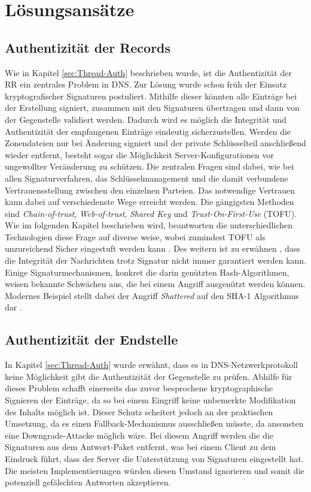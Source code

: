 \chapter{Lösungsansätze}

\section{Authentizität der Records}
\label{sec:Solution-RecordAuth}

Wie in Kapitel \ref{sec:Thread-Auth} beschrieben wurde, ist die Authentizität der RR ein zentrales Problem in DNS. Zur Lösung wurde schon früh der Einsatz kryptografischer Signaturen postuliert. Mithilfe dieser könnten alle Einträge bei der Erstellung signiert, zusammen mit den Signaturen übertragen und dann von der Gegenstelle validiert werden. Dadurch wird es möglich die Integrität und Authentizität der empfangenen Einträge eindeutig sicherzustellen. Werden die Zonendateien nur bei Änderung signiert und der private Schlüsselteil anschließend wieder entfernt, besteht sogar die Möglichkeit Server-Konfigurationen vor ungewollter Veränderung zu schützen. 
Die zentralen Fragen sind dabei, wie bei allen Signaturverfahren, das Schlüsselmanagement und die damit verbundene Vertrauensstellung zwischen den einzelnen Parteien. Das notwendige Vertrauen kann dabei auf verschiedenste Wege erreicht werden. Die gängigsten Methoden sind \textit{Chain-of-trust}, \textit{Web-of-trust}, \textit{Shared Key} und \textit{Trust-On-First-Use} (TOFU). Wie im folgenden Kapitel beschrieben wird, beantworten die unterschiedlichen Technologien diese Frage auf diverse weise, wobei zumindest TOFU als unzureichend Sicher eingestuft werden kann \cite{Wendlandt2008}.
Des weitern ist zu erwähnen , dass die Integrität der Nachrichten trotz Signatur nicht immer garantiert werden kann. Einige Signaturmechanismen, konkret die darin genützten Hash-Algorithmen, weisen bekannte Schwächen aus, die bei einem Angriff ausgenützt werden können. Modernes Beispiel stellt dabei der Angriff \textit{Shattered} auf den SHA-1 Algorithmus dar \cite{Stevens2017}. 

\section{Authentizität der Endstelle}

In Kapitel \ref{sec:Thread-Auth} wurde erwähnt, dass es in DNS-Netzwerkprotokoll keine Möglichkeit gibt die Authentizität der Gegenstelle zu prüfen. Abhilfe für dieses Problem schafft einerseits das zuvor besprochene kryptographische Signieren der Einträge, da so bei einem Eingriff keine unbemerkte Modifikation des Inhalts möglich ist. Dieser Schutz scheitert jedoch an der praktischen Umsetzung, da es einen Fallback-Mechanismus ausschließen müsste, da ansonsten eine Downgrade-Attacke möglich wäre. Bei diesem Angriff werden die die Signaturen aus dem Antwort-Paket entfernt, was bei einem Client zu dem Eindruck führt, dass der Server die Unterstützung von Signaturen eingestellt hat. Die meisten Implementierungen würden diesen Umstand ignorieren und somit die potenziell gefälschten Antworten akzeptieren.  

